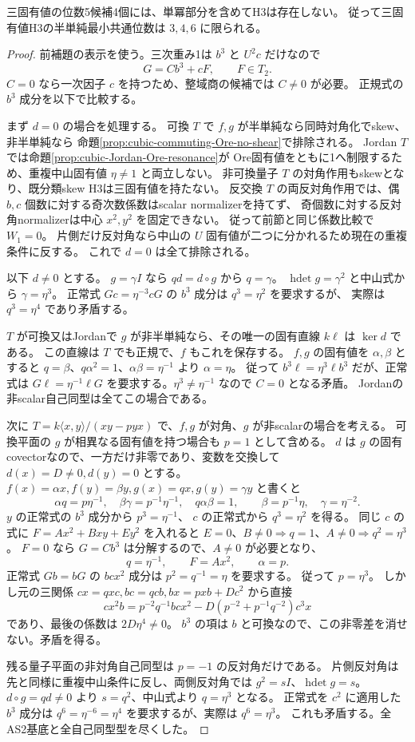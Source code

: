 \begin{theorem}
\label{thm:cubic-fifth-root-spectrum-empty}
三固有値の位数5候補4個には、単冪部分を含めてH3は存在しない。
従って三固有値H3の半単純最小共通位数は $3,4,6$ に限られる。
\end{theorem}
\begin{proof}
前補題の表示を使う。三次重み1は $b^3$ と $U^2c$ だけなので
\[
 G=C b^3+cF,\qquad F\in T_2.
\]
$C=0$ なら一次因子 $c$ を持つため、整域商の候補では $C\ne0$ が必要。
正規式の $b^3$ 成分を以下で比較する。

まず $d=0$ の場合を処理する。
可換 $T$ で $f,g$ が半単純なら同時対角化でskew、非半単純なら
命題\ref{prop:cubic-commuting-Ore-no-shear}で排除される。
Jordan $T$ では命題\ref{prop:cubic-Jordan-Ore-resonance}が
Ore固有値をともに1へ制限するため、重複中山固有値 $\eta\ne1$ と両立しない。
非可換量子 $T$ の対角作用もskewとなり、既分類skew H3は三固有値を持たない。
反交換 $T$ の両反対角作用では、偶 $b,c$ 個数に対する奇次数係数はscalar normalizerを持てず、
奇個数に対する反対角normalizerは中心 $x^2,y^2$ を固定できない。
従って前節と同じ係数比較で $W_1=0$。
片側だけ反対角なら中山の $U$ 固有値が二つに分かれるため現在の重複条件に反する。
これで $d=0$ は全て排除される。

以下 $d\ne0$ とする。
$g=\gamma I$ なら $qd=d\circ g$ から $q=\gamma$。
$\operatorname{hdet}g=\gamma^2$ と中山式から $\gamma=\eta^3$。
正常式 $Gc=\eta^{-3}cG$ の $b^3$ 成分は $q^3=\eta^2$ を要求するが、
実際は $q^3=\eta^4$ であり矛盾する。

$T$ が可換又はJordanで $g$ が非半単純なら、その唯一の固有直線 $k\ell$ は $\ker d$ である。
この直線は $T$ でも正規で、$f$ もこれを保存する。
$f,g$ の固有値を $\alpha,\beta$ とすると
$q=\beta$、$q\alpha^2=1$、$\alpha\beta=\eta^{-1}$ より $\alpha=\eta$。
従って $b^3\ell=\eta^3\ell b^3$ だが、正常式は
$G\ell=\eta^{-1}\ell G$ を要求する。$\eta^3\ne\eta^{-1}$ なので $C=0$ となる矛盾。
Jordanの非scalar自己同型は全てこの場合である。

次に $T=k\langle x,y\rangle/(xy-pyx)$ で、$f,g$ が対角、$g$ が非scalarの場合を考える。
可換平面の $g$ が相異なる固有値を持つ場合も $p=1$ として含める。
$d$ は $g$ の固有covectorなので、一方だけ非零であり、変数を交換して
$d(x)=D\ne0,d(y)=0$ とする。
$f(x)=\alpha x,f(y)=\beta y,g(x)=q x,g(y)=\gamma y$ と書くと
\[
 \alpha q=p\eta^{-1},\quad
 \beta\gamma=p^{-1}\eta^{-1},\quad q\alpha\beta=1,
 \qquad\beta=p^{-1}\eta,\quad\gamma=\eta^{-2}.
\]
$y$ の正常式の $b^3$ 成分から $p^3=\eta^{-1}$、
$c$ の正常式から $q^3=\eta^2$ を得る。
同じ $c$ の式に $F=A x^2+Bxy+Ey^2$ を入れると
$E=0$、$B\ne0\Rightarrow q=1$、$A\ne0\Rightarrow q^2=\eta^3$。
$F=0$ なら $G=C b^3$ は分解するので、$A\ne0$ が必要となり、
\[
 q=\eta^{-1},\qquad F=A x^2,\qquad\alpha=p.
\]
正常式 $Gb=bG$ の $bcx^2$ 成分は $p^2=q^{-1}=\eta$ を要求する。
従って $p=\eta^3$。
しかし元の三関係 $cx=qxc,bc=qcb,bx=p xb+D c^2$ から直接
\[
 c x^2b=p^{-2}q^{-1}b c x^2
       -D(p^{-2}+p^{-1}q^{-2})c^3x
\]
であり、最後の係数は $2D\eta^4\ne0$。
$b^3$ の項は $b$ と可換なので、この非零差を消せない。矛盾を得る。

残る量子平面の非対角自己同型は $p=-1$ の反対角だけである。
片側反対角は先と同様に重複中山条件に反し、両側反対角では
$g^2=sI$、$\operatorname{hdet}g=s$。
$d\circ g=qd\ne0$ より $s=q^2$、中山式より $q=\eta^3$ となる。
正常式を $c^2$ に適用した $b^3$ 成分は
$q^6=\eta^{-6}=\eta^4$ を要求するが、実際は $q^6=\eta^3$。
これも矛盾する。全AS2基底と全自己同型型を尽くした。
\end{proof}
